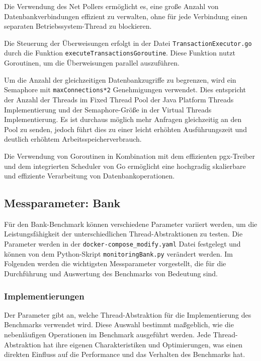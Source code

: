 \documentclass[fontsize=12pt,paper=a4,twoside=semi,parskip=half-,headsepline,headinclude]{scrreprt}
\begin{document}
Die Verwendung des Net Pollers ermöglicht es, eine große Anzahl von Datenbankverbindungen effizient zu verwalten, ohne für jede Verbindung einen separaten Betriebssystem-Thread zu blockieren.

Die Steuerung der Überweisungen erfolgt in der Datei \texttt{TransactionExecutor.go} durch die Funktion \texttt{executeTransactionsGoroutine}. Diese Funktion nutzt Goroutinen, um die Überweisungen parallel auszuführen.

Um die Anzahl der gleichzeitigen Datenbankzugriffe zu begrenzen, wird ein Semaphore mit \texttt{maxConnections*2} Genehmigungen verwendet. Dies entspricht der Anzahl der Threads im Fixed Thread Pool der Java Platform Threads Implementierung und der Semaphore-Größe in der Virtual Threads Implementierung. Es ist durchaus möglich mehr Anfragen gleichzeitig an den Pool zu senden, jedoch führt dies zu einer leicht erhöhten Ausführungszeit und deutlich erhöhtem Arbeitsspeicherverbrauch.

Die Verwendung von Goroutinen in Kombination mit dem effizienten pgx-Treiber und dem integrierten Scheduler von Go ermöglicht eine hochgradig skalierbare und effiziente Verarbeitung von Datenbankoperationen.

\subsection{Messparameter: Bank}

Für den Bank-Benchmark können verschiedene Parameter variiert werden, um die Leistungsfähigkeit der unterschiedlichen Thread-Abstraktionen zu testen. Die Parameter werden in der \texttt{docker-compose\_modify.yaml} Datei festgelegt und können von dem Python-Skript \texttt{monitoringBank.py} verändert werden. Im Folgenden werden die wichtigsten Messparameter vorgestellt, die für die Durchführung und Auswertung des Benchmarks von Bedeutung sind.

\subsubsection{Implementierungen}

Der Parameter gibt an, welche Thread-Abstraktion für die Implementierung des Benchmarks verwendet wird. Diese Auswahl bestimmt maßgeblich, wie die nebenläufigen Operationen im Benchmark ausgeführt werden. Jede Thread-Abstraktion hat ihre eigenen Charakteristiken und Optimierungen, was einen direkten Einfluss auf die Performance und das Verhalten des Benchmarks hat.
\end{document}
